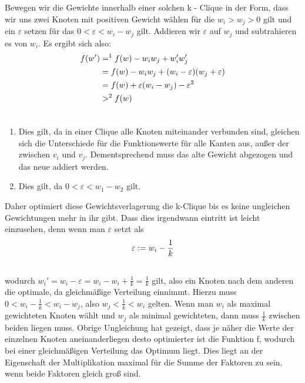 \documentclass[12pt, a4paper]{article}
\begin{document}
Bewegen wir die Gewichte innerhalb einer solchen k - Clique in der Form, dass wir uns zwei Knoten mit positiven Gewicht wählen für die $w_i > w_j > 0$ gilt und ein $\varepsilon$ setzen für das $0 < \varepsilon < w_i - w_j$ gilt. Addieren wir $\varepsilon$ auf $w_j$ und subtrahieren es von $w_i$. Es ergibt sich also:
\begin{gather}
\begin{split}f(w') &=^1 f(w) - w_i w_j + w'_i w'_j \\
&= f(w) - w_i w_j + (w_i - \varepsilon)(w_j + \varepsilon) \\
&= f(w) + \varepsilon (w_i - w_j) - \varepsilon^2 \\
&>^2 f(w)\end{split}\notag\\\begin{split}\end{split}\notag
\end{gather}\begin{enumerate}
\item {}
Dies gilt, da in einer Clique alle Knoten miteinander verbunden sind, gleichen sich die Unterschiede für die Funktionswerte für alle Kanten aus, außer der zwischen $v_i$ und $v_j$. Dementsprechend muss das alte Gewicht abgezogen und das neue addiert werden.

\item {}
Dies gilt, da $0 < \varepsilon < w_1 - w_2$ gilt.

\end{enumerate}

Daher optimiert diese Gewichtsverlagerung die k-Clique bis es keine ungleichen Gewichtungen mehr in ihr gibt.
Dass dies irgendwann eintritt ist leicht einzusehen, denn wenn man $\varepsilon$ setzt als
\begin{gather}
\begin{split}\varepsilon := w_i - \frac{1}{k}\end{split}\notag\\\begin{split}\end{split}\notag
\end{gather}
wodurch $w_i' = w_i - \varepsilon = w_i - w_i + \frac{1}{k} = \frac{1}{k}$ gilt, also ein Knoten nach dem anderen die optimale, da gleichmäßige Verteilung einnimmt. Hierzu muss $0 < w_i - \frac{1}{k} < w_i - w_j$, also $w_j < \frac{1}{k} < w_i$ gelten. Wenn man $w_i$ als maximal gewichteten Knoten wählt und $w_j$ als minimal gewichteten, dann muss $\frac{1}{k}$ zwischen beiden liegen muss. Obrige Ungleichung hat gezeigt, dass je näher die Werte der einzelnen Knoten aneinanderliegen desto optimierter ist die Funktion f, wodurch bei einer gleichmäßigen Verteilung das Optimum liegt. Dies liegt an der Eigenschaft der Multiplikation maximal für die Summe der Faktoren zu sein, wenn beide Faktoren gleich groß sind.
\end{document}
